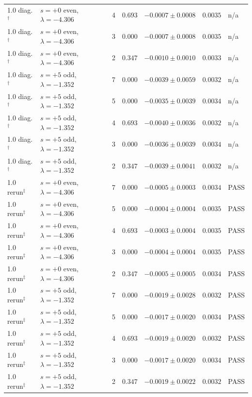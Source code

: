 \begin{tabular}{llrrlll}
1.0 diag.$^\dagger$ & $s=+0$ even, $\lambda=-4.306$ & 4 & $0.693$ & $-0.0007\pm0.0008$ & $0.0035$ & n/a \\
1.0 diag.$^\dagger$ & $s=+0$ even, $\lambda=-4.306$ & 3 & $0.000$ & $-0.0007\pm0.0008$ & $0.0035$ & n/a \\
1.0 diag.$^\dagger$ & $s=+0$ even, $\lambda=-4.306$ & 2 & $0.347$ & $-0.0010\pm0.0010$ & $0.0033$ & n/a \\
1.0 diag.$^\dagger$ & $s=+5$ odd, $\lambda=-1.352$ & 7 & $0.000$ & $-0.0039\pm0.0059$ & $0.0032$ & n/a \\
1.0 diag.$^\dagger$ & $s=+5$ odd, $\lambda=-1.352$ & 5 & $0.000$ & $-0.0035\pm0.0039$ & $0.0034$ & n/a \\
1.0 diag.$^\dagger$ & $s=+5$ odd, $\lambda=-1.352$ & 4 & $0.693$ & $-0.0040\pm0.0036$ & $0.0032$ & n/a \\
1.0 diag.$^\dagger$ & $s=+5$ odd, $\lambda=-1.352$ & 3 & $0.000$ & $-0.0036\pm0.0039$ & $0.0034$ & n/a \\
1.0 diag.$^\dagger$ & $s=+5$ odd, $\lambda=-1.352$ & 2 & $0.347$ & $-0.0039\pm0.0041$ & $0.0032$ & n/a \\
1.0 rerun$^\ddagger$ & $s=+0$ even, $\lambda=-4.306$ & 7 & $0.000$ & $-0.0005\pm0.0003$ & $0.0034$ & PASS \\
1.0 rerun$^\ddagger$ & $s=+0$ even, $\lambda=-4.306$ & 5 & $0.000$ & $-0.0004\pm0.0004$ & $0.0035$ & PASS \\
1.0 rerun$^\ddagger$ & $s=+0$ even, $\lambda=-4.306$ & 4 & $0.693$ & $-0.0003\pm0.0004$ & $0.0035$ & PASS \\
1.0 rerun$^\ddagger$ & $s=+0$ even, $\lambda=-4.306$ & 3 & $0.000$ & $-0.0004\pm0.0004$ & $0.0035$ & PASS \\
1.0 rerun$^\ddagger$ & $s=+0$ even, $\lambda=-4.306$ & 2 & $0.347$ & $-0.0005\pm0.0005$ & $0.0034$ & PASS \\
1.0 rerun$^\ddagger$ & $s=+5$ odd, $\lambda=-1.352$ & 7 & $0.000$ & $-0.0019\pm0.0028$ & $0.0032$ & PASS \\
1.0 rerun$^\ddagger$ & $s=+5$ odd, $\lambda=-1.352$ & 5 & $0.000$ & $-0.0017\pm0.0020$ & $0.0034$ & PASS \\
1.0 rerun$^\ddagger$ & $s=+5$ odd, $\lambda=-1.352$ & 4 & $0.693$ & $-0.0019\pm0.0020$ & $0.0032$ & PASS \\
1.0 rerun$^\ddagger$ & $s=+5$ odd, $\lambda=-1.352$ & 3 & $0.000$ & $-0.0017\pm0.0020$ & $0.0034$ & PASS \\
1.0 rerun$^\ddagger$ & $s=+5$ odd, $\lambda=-1.352$ & 2 & $0.347$ & $-0.0019\pm0.0022$ & $0.0032$ & PASS \\

\end{tabular}
